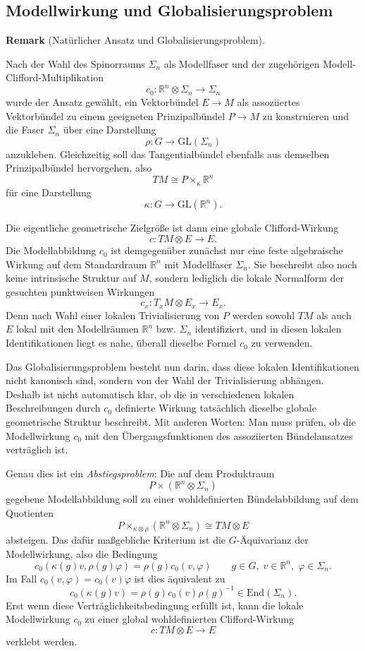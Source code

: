 \documentclass[10pt, letterpaper]{article}
\newcommand{\R}{\mathbb{R}}
\newcommand{\End}{\mathrm{End}}
\newcommand{\GL}{\mathrm{GL}}
\newcommand{\CustomHeading}[3]{%
  \par\medskip\noindent%
  \textbf{#1 #2} \textnormal{(#3)}.\enskip%
}
\newenvironment{REM}[2]{\CustomHeading{Remark}{#1}{#2}}{}
\begin{document}
\subsection{Modellwirkung und Globalisierungsproblem}

\begin{REM}{}{Natürlicher Ansatz und Globalisierungsproblem}
Nach der Wahl des Spinorraums \(\Sigma_n\) als Modellfaser und der zugehörigen Modell-Clifford-Multiplikation
\[
c_0:\R^n\otimes \Sigma_n\longrightarrow \Sigma_n
\]
wurde der Ansatz gewählt, ein Vektorbündel \(E\to M\) als assoziiertes Vektorbündel zu einem geeigneten Prinzipalbündel \(P\to M\) zu konstruieren und die Faser \(\Sigma_n\) über eine Darstellung
\[
\rho:G\to \GL(\Sigma_n)
\]
anzukleben. Gleichzeitig soll das Tangentialbündel ebenfalls aus demselben Prinzipalbündel hervorgehen, also
\[
TM\cong P\times_\kappa \R^n
\]
für eine Darstellung
\[
\kappa:G\to \GL(\R^n).
\]

Die eigentliche geometrische Zielgröße ist dann eine globale Clifford-Wirkung
\[
c:TM\otimes E\longrightarrow E.
\]
Die Modellabbildung \(c_0\) ist demgegenüber zunächst nur eine feste algebraische Wirkung auf dem Standardraum \(\R^n\) mit Modellfaser \(\Sigma_n\). Sie beschreibt also noch keine intrinsische Struktur auf \(M\), sondern lediglich die lokale Normalform der gesuchten punktweisen Wirkungen
\[
c_x:T_xM\otimes E_x\longrightarrow E_x.
\]
Denn nach Wahl einer lokalen Trivialisierung von \(P\) werden sowohl \(TM\) als auch \(E\) lokal mit den Modellräumen \(\R^n\) bzw. \(\Sigma_n\) identifiziert, und in diesen lokalen Identifikationen liegt es nahe, überall dieselbe Formel \(c_0\) zu verwenden.

Das Globalisierungsproblem besteht nun darin, dass diese lokalen Identifikationen nicht kanonisch sind, sondern von der Wahl der Trivialisierung abhängen. Deshalb ist nicht automatisch klar, ob die in verschiedenen lokalen Beschreibungen durch \(c_0\) definierte Wirkung tatsächlich dieselbe globale geometrische Struktur beschreibt. Mit anderen Worten: Man muss prüfen, ob die Modellwirkung \(c_0\) mit den Übergangsfunktionen des assoziierten Bündelansatzes verträglich ist.

Genau dies ist ein \emph{Abstiegsproblem}: Die auf dem Produktraum
\[
P\times (\R^n\otimes \Sigma_n)
\]
gegebene Modellabbildung soll zu einer wohldefinierten Bündelabbildung auf dem Quotienten
\[
P\times_{\kappa\otimes\rho}(\R^n\otimes \Sigma_n)\cong TM\otimes E
\]
absteigen. Das dafür maßgebliche Kriterium ist die \(G\)-Äquivarianz der Modellwirkung, also die Bedingung
\[
c_0(\kappa(g)v,\rho(g)\varphi)=\rho(g)c_0(v,\varphi)
\qquad
g\in G,\; v\in \R^n,\; \varphi\in \Sigma_n.
\]
Im Fall \(c_0(v,\varphi)=c_0(v)\varphi\) ist dies äquivalent zu
\[
c_0(\kappa(g)v)=\rho(g)c_0(v)\rho(g)^{-1}\in\End(\Sigma_n).
\]
Erst wenn diese Verträglichkeitsbedingung erfüllt ist, kann die lokale Modellwirkung \(c_0\) zu einer global wohldefinierten Clifford-Wirkung
\[
c:TM\otimes E\longrightarrow E
\]
verklebt werden.
\end{REM}
\end{document}
